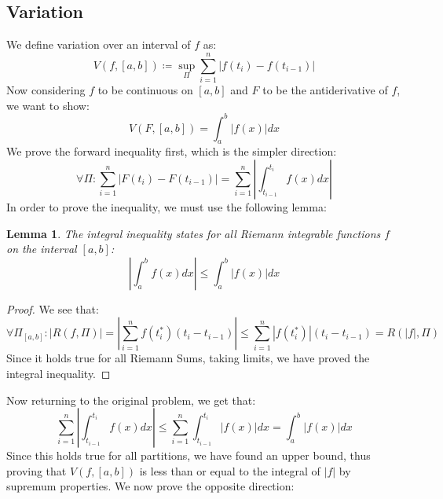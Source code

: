 \documentclass[10pt,letterpaper]{article} %
\newtheorem{lem}{Lemma}[section]
\begin{document}
\subsection{Variation}
We define variation over an interval of $f$ as:
\begin{equation*}
  V(f, [a, b]) \coloneq \sup_{\Pi}\sum_{i=1}^{n}|f(t_i) - f(t_{i-1})|
\end{equation*}
Now considering $f$ to be continuous on $[a, b]$ and $F$ to be the antiderivative of $f$, we want to show:
\begin{equation*}
  V(F, [a, b]) = \int_{a}^{b}|f(x)|dx
\end{equation*}
We prove the forward inequality first, which is the simpler direction:
\begin{equation*}
  \forall \Pi: \sum_{i=1}^{n}|F(t_i) - F(t_{i-1})| = \sum_{i=1}^n \left|\int_{t_{i-1}}^{t_i} f(x) dx \right|
\end{equation*}
In order to prove the inequality, we must use the following lemma:
\begin{lem}
The integral inequality states for all Riemann integrable functions $f$ on the interval $[a, b]$:
\begin{equation*}
  \left|\int_{a}^{b} f(x)dx \right| \leqslant \int_{a}^{b} |f(x)| dx
\end{equation*}
\end{lem}
\begin{proof}
We see that:
\begin{equation*}
  \forall \Pi_{[a, b]}: |R(f, \Pi)| = \left|\sum_{i=1}^{n} f(t_i^*)(t_i - t_{i-1})\right| \leqslant \sum_{i=1}^{n}|f(t_i^*)|(t_i - t_{i-1}) = R(|f|, \Pi)
\end{equation*}
Since it holds true for all Riemann Sums, taking limits, we have proved the integral inequality.
\end{proof}
Now returning to the original problem, we get that:
\begin{equation*}
  \sum_{i=1}^n \left|\int_{t_{i-1}}^{t_i} f(x) dx \right| \leqslant \sum_{i=1}^n \int_{t_{i-1}}^{t_i}|f(x)|dx = \int_{a}^{b}|f(x)|dx
\end{equation*}
Since this holds true for all partitions, we have found an upper bound, thus proving that $V(f, [a, b])$ is less than or equal to the integral of $|f|$ by supremum properties. We now prove the opposite direction:\\
\end{document}
